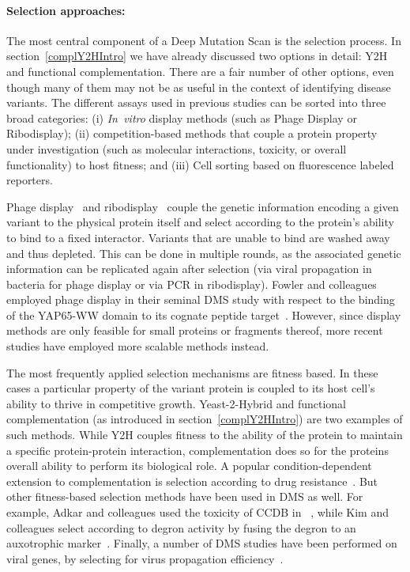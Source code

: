 \paragraph{Selection approaches:} The most central component of a Deep Mutation Scan is the selection process. In section~\ref{complY2HIntro} we have already discussed two options in detail: Y2H and functional complementation. There are a fair number of other options, even though many of them may not be as useful in the context of identifying disease variants. The different assays used in previous studies can be sorted into three broad categories: (i) \textit{In~vitro} display methods (such as Phage Display or Ribodisplay); (ii) competition-based methods that couple a protein property under investigation (such as molecular interactions, toxicity, or overall functionality) to host fitness; and (iii) Cell sorting based on fluorescence labeled reporters.

Phage display~\cite{smith_filamentous_1985} and ribodisplay~ couple the genetic information encoding a given variant to the physical protein itself and select according to the protein's ability to bind to a fixed interactor. Variants that are unable to bind are washed away and thus depleted. This can be done in multiple rounds, as the associated genetic information can be replicated again after selection (via viral propagation in bacteria for phage display or via PCR in ribodisplay). Fowler and colleagues employed phage display in their seminal DMS study with respect to the binding of the YAP65-WW domain to its cognate peptide target~\cite{fowler_high-resolution_2010}. However, since display methods are only feasible for small proteins or fragments thereof, more recent studies have employed more scalable methods instead.

The most frequently applied selection mechanisms are fitness based. In these cases a particular property of the variant protein is coupled to its host cell's ability to thrive in competitive growth. Yeast-2-Hybrid and functional complementation (as introduced in section~\ref{complY2HIntro}) are two examples of such methods. While Y2H couples fitness to the ability of the protein to maintain a specific protein-protein interaction, complementation does so for the proteins overall ability to perform its biological role. A popular condition-dependent extension to complementation is selection according to drug resistance~\cite{wu_systematic_2013,wagenaar_resistance_2014}. But other fitness-based selection methods have been used in DMS as well. For example, Adkar and colleagues used the toxicity of CCDB in ~\cite{adkar_protein_2012}, while Kim and colleagues select according to degron activity by fusing the degron to an auxotrophic marker~\cite{kim_high-throughput_2013}. Finally, a number of DMS studies have been performed on viral genes, by selecting for virus propagation efficiency~\cite{bloom_2014,thyagarajan_inherent_2014}.

